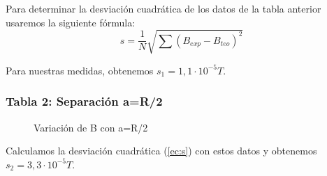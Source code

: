 \documentclass[12pt, a4paper, titlepage]{article}
\begin{document}
  Para determinar la desviación cuadrática de los datos de la tabla anterior usaremos la siguiente fórmula:
  \begin{equation}
    s = \frac{1}{N} \sqrt{\sum{\left(B_{exp} - B_{teo}\right)^2}} \label{ec:s}
  \end{equation}

  Para nuestras medidas, obtenemos $s_1 = 1,1 \cdot 10^{-5} T$.

  \vspace{1cm}

  \begin{minipage}{0.49\textwidth}
    \subsubsection{Tabla 2: Separación a=R/2}

    \begin{figure}[H]
      \begin{table}[H]
         \quad
      \end{table}
      \caption{Variación de B con a=R/2}
    \end{figure}

    Calculamos la desviación cuadrática (\ref{ec:s}) con estos datos y obtenemos $s_2 = 3,3 \cdot 10^{-5} T$.
  \end{minipage} \hfill
\end{document}
